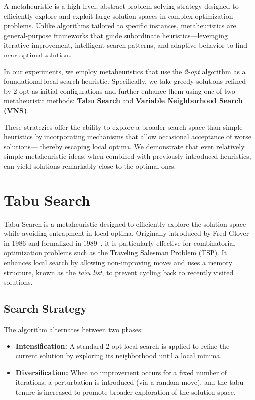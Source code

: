 A metaheuristic is a high-level, abstract problem-solving strategy designed to efficiently explore and exploit large solution spaces 
in complex optimization problems. Unlike algorithms tailored to specific instances, metaheuristics are general-purpose frameworks 
that guide subordinate heuristics—leveraging iterative improvement, intelligent search patterns, and adaptive behavior to find near-optimal solutions.

In our experiments, we employ metaheuristics that use the \textit{2-opt} algorithm as a foundational local search heuristic. 
Specifically, we take greedy solutions refined by 2-opt as initial configurations and further enhance them using one of two metaheuristic methods: 
\textbf{Tabu Search} and \textbf{Variable Neighborhood Search (VNS)}.

These strategies offer the ability to explore a broader search space than simple heuristics by incorporating mechanisms that allow 
occasional acceptance of worse solutions— thereby escaping local optima. We demonstrate that even relatively simple metaheuristic ideas, 
when combined with previously introduced heuristics, can yield solutions remarkably close to the optimal ones.

\section{Tabu Search}
\label{sec:tabu}
Tabu Search is a metaheuristic designed to efficiently explore the solution space while avoiding entrapment in local optima. Originally introduced by Fred Glover in 1986 and formalized in 1989~\cite{Glover:TabuSearch}, it is particularly effective for combinatorial optimization problems such as the Traveling Salesman Problem (TSP). It enhances local search by allowing non-improving moves and uses a memory structure, known as the \textit{tabu list}, to prevent cycling back to recently visited solutions.

\subsection{Search Strategy}

The algorithm alternates between two phases:

\begin{itemize}
    \item \textbf{Intensification:} A standard 2-opt local search is applied to refine the current solution by exploring its neighborhood until a local minima.
    \item \textbf{Diversification:} When no improvement occurs for a fixed number of iterations, a perturbation is introduced (via a random move), and the tabu tenure is increased to promote broader exploration of the solution space.
\end{itemize}

